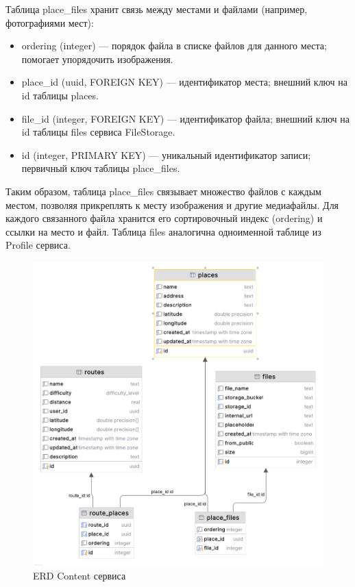Таблица place\_files хранит связь между местами и файлами (например, фотографиями мест):
\begin{itemize}
    \item ordering (integer) — порядок файла в списке файлов для данного места; помогает упорядочить изображения.
    \item place\_id (uuid, FOREIGN KEY) — идентификатор места; внешний ключ на id таблицы places.
    \item file\_id (integer, FOREIGN KEY) — идентификатор файла; внешний ключ на id таблицы files сервиса FileStorage.
    \item id (integer, PRIMARY KEY) — уникальный идентификатор записи; первичный ключ таблицы place\_files.
\end{itemize}
Таким образом, таблица place\_files связывает множество файлов с каждым местом, позволяя прикреплять к месту изображения и другие медиафайлы. Для каждого связанного файла хранится его сортировочный индекс (ordering) и ссылки на место и файл.
Таблица files аналогична одноименной таблице из Profile сервиса.
\begin{figure}[H]
        \centering
        \includegraphics[width=0.8\linewidth]{Images/second_chapter_backend_architecture/Picture12.png}
        \caption{ERD Content сервиса}
        \label{fig:content-service-erd}
\end{figure}

